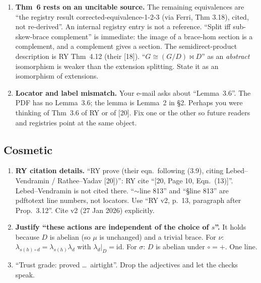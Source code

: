 \documentclass[11pt]{article}
\newcommand{\Z}{\mathbb{Z}}
\begin{document}
\begin{enumerate}[leftmargin=*,resume]
  $(G,+)=\Z_2\times\Z_4$ and $D=\{0\}\times\Z_4$'', which leaves $\circ$ unspecified.
  Several such braces exist, with different socles. The split triple is ``imported as
  computed from the enumerator (scratch file)''. A reader cannot check any of it. Give
  $\circ$ explicitly and the three complement arguments by hand; the witness above takes
  four lines.
\item \textbf{Thm~6 rests on an uncitable source.} The remaining equivalences are ``the
  registry result corrected-equivalence-1-2-3 (via Ferri, Thm 3.18), cited, not
  re-derived''. An internal registry entry is not a reference. ``Split iff sub-skew-brace
  complement'' is immediate: the image of a brace-hom section is a complement, and a
  complement gives a section. The semidirect-product description is RY Thm~4.12 (their
  [18]). ``$G\cong(G/D)\bowtie D$'' as an \emph{abstract} isomorphism is weaker than the
  extension splitting. State it as an isomorphism of extensions.
\item \textbf{Locator and label mismatch.} Your e-mail asks about ``Lemma~3.6''. The PDF has
  no Lemma~3.6; the lemma is Lemma~2 in \S2. Perhaps you were thinking of Thm~3.6 of RY or
  of [20]. Fix one or the other so future readers and registries point at the same object.
\end{enumerate}
\subsection*{Cosmetic}
\begin{enumerate}[leftmargin=*,resume]
\item \textbf{RY citation details.} ``RY prove (their eqn.\ following (3.9), citing
  Lebed--Vendramin / Rathee--Yadav [20])'': RY cite ``[20, Page 10, Eqn.~(13)]''. Lebed--Vendramin
  is not cited there. ``$\sim$line 813'' and ``\S line 813'' are pdftotext line numbers, not
  locators. Use ``RY v2, p.~13, paragraph after Prop.~3.12''. Cite v2 (27 Jan 2026)
  explicitly.
\item \textbf{Justify ``these actions are independent of the choice of $s$''.} It holds
  because $D$ is abelian (so $\mu$ is unchanged) and a trivial brace. For $\nu$:
  $\lambda_{s(h)\circ d}=\lambda_{s(h)}\lambda_d$ with $\lambda_d|_D=\mathrm{id}$. For
  $\sigma$: $D$ is abelian under $\circ=+$. One line.
\item ``Trust grade: proved \ldots\ airtight''. Drop the adjectives and let the checks speak.
\end{enumerate}
\end{document}
